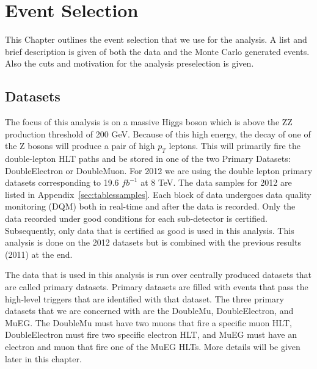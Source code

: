 \chapter{Event Selection}

This Chapter outlines the event selection that we use for the analysis.  A list and brief description is given of both the data and the Monte Carlo generated events. Also the cuts and motivation for the analysis preselection is given.

\section{Datasets}

The focus of this analysis is on a massive Higgs boson which is above the ZZ production threshold of 200 GeV.  Because of this high energy, the decay of one of the Z bosons will produce a pair of high $p_T$ leptons.  This will primarily fire the double-lepton HLT paths and be stored in one of the two Primary Datasets: DoubleElectron or DoubleMuon.  For 2012 we are using the double lepton primary datasets corresponding to 19.6 $fb^{-1}$ at 8 TeV. The data samples for 2012 are listed in Appendix~\ref{sec:tablessamples}.  Each block of data undergoes data quality monitoring (DQM) both in real-time and after the data is recorded.  Only the data recorded under good conditions for each sub-detector is certified.  Subsequently, only data that is certified as good is used in this analysis. This analysis is done on the 2012 datasets but is combined with the previous results (2011) at the end.

The data that is used in this analysis is run over centrally produced datasets that are called primary datasets.  Primary datasets are filled with events that pass the high-level triggers that are identified with that dataset.  The three primary datasets that we are concerned with are the DoubleMu, DoubleElectron, and MuEG.  The DoubleMu must have two muons that fire a specific muon HLT, DoubleElectron must fire two specific electron HLT, and MuEG must have an electron and muon that fire one of the MuEG HLTs.  More details will be given later in this chapter.



    
